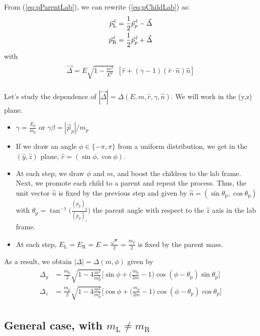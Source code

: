 \documentclass[12pt]{article}
\newcommand{\bea}{\begin{eqnarray}\begin{aligned}}
\newcommand{\eea}{\end{aligned}\end{eqnarray}}
\begin{document}
From (\ref{eq:pParentLab}), we can rewrite (\ref{eq:pChildLab}) as:
\bea\label{eq:pChildLab2}
\vec{p}^{\it{\,l}}_{\text{L}}= \frac{1}{2} \vec{p}^{\it{\,l}}_p - \vec{\Delta}  \\
\vec{p}^{\it{\,l}}_{\text{R}}= \frac{1}{2} \vec{p}^{\it{\,l}}_p + \vec{\Delta}
\eea
with
\bea\label{eq:delta}
 \vec{\Delta}   = E \sqrt{1-\frac{m^2}{E^2}} \,\,\,[ \hat{r} + (\gamma -1) (\hat{r} \cdot \hat{n}) \hat{n} ] 
\eea

Let's study the dependence of $|\vec{\Delta}|=\Delta(E,m,\hat{r},\gamma,\hat{n})$. We will work in the (y,z) plane.

\begin{itemize}
\item $\gamma=\frac{E_p}{m_p}$ or $\gamma \beta = |\vec{p}_p|/m_p$
\item If we draw an angle $\phi \in \{-\pi,\pi\}$ from a uniform distribution, we get in the $(\hat{y},\hat{z})$ plane,  $\hat{r}= (\sin{\phi}, \cos{\phi})$.

\item At each step, we draw $\phi$ and $m$, and boost the children to the lab frame. Next, we promote each child to a parent and repeat the process. Thus, the unit vector $\hat{n}$ is fixed by the previous step and given by $\hat{n}=(\sin{\theta_\text{p}}, \cos{\theta_\text{p}})$ with $\theta_\text{p}=\tan^{-1}\bigg({\frac{(p_{\text{p}})_y}{(p_{\text{p}})_z}}\bigg)$ the parent angle with respect to the $\hat{z}$ axis in the lab frame. 

\item At each step, $E_{\text{L}}=E_{\text{R}}=E =\frac{\sqrt{s}}{2}= \frac{m_{\text{p}}}{2}$ is fixed by the parent mass.

\end{itemize}

As a result, we obtain $|\Delta|=\Delta(m,\phi)$ given by
\bea
 \Delta_y   &= \frac{m_\text{p}}{2} \sqrt{1- 4\frac{m^2}{m_\text{p}^2}}  \bigg[ \sin{\phi} + \bigg(\frac{m_\text{p}}{ 2 m}-1\bigg) \cos{(\phi-\theta_\text{p})} \sin{\theta_\text{p}} \bigg]\\ 
  \Delta_z   &= \frac{m_\text{p}}{2} \sqrt{1- 4\frac{m^2}{m_\text{p}^2}}   \bigg[\cos{\phi} +  \bigg(\frac{m_\text{p}}{2 m}-1\bigg) \cos{(\phi-\theta_\text{p})} \cos{\theta_\text{p}} \bigg]
\eea


\subsection{General case, with  $m_{\text{L}}\neq m_{\text{R}}$}
\end{document}
